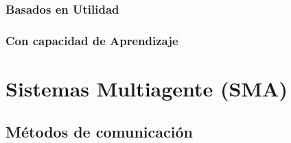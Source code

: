 \subsubsection*{Basados en Utilidad}

\subsubsection*{Con capacidad de Aprendizaje}

\section*{Sistemas Multiagente (SMA)}


\subsection*{Métodos de comunicación}
